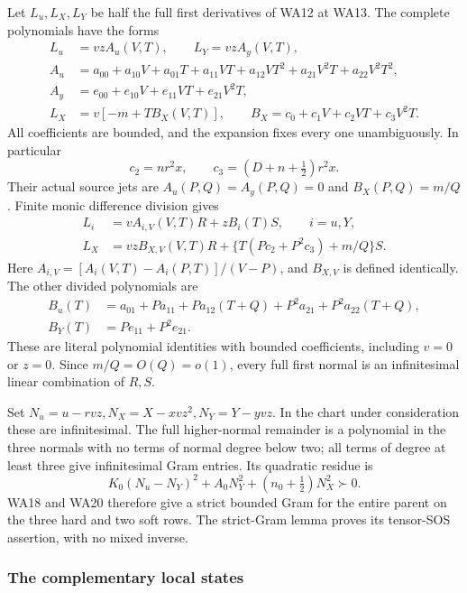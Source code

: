 Let \(L_u,L_X,L_Y\) be half the full first derivatives of WA12 at
WA13. The complete polynomials have the forms
\[
\begin{aligned}
 L_u&=vz A_u(V,T),\qquad L_Y=vz A_y(V,T),\\
 A_u&=a_{00}+a_{10}V+a_{01}T+a_{11}VT
                      +a_{12}VT^2+a_{21}V^2T+a_{22}V^2T^2,\\
 A_y&=e_{00}+e_{10}V+e_{11}VT+e_{21}V^2T,\\
 L_X&=v[-m+TB_X(V,T)],\qquad
 B_X=c_0+c_1V+c_2VT+c_3V^2T .
\end{aligned}\tag{WA19}
\]
All coefficients are bounded, and the expansion fixes every one
unambiguously. In particular
\[
 c_2=nr^2x,\qquad c_3=(D+n+\tfrac12)r^2x .
\]
Their actual source jets are \(A_u(P,Q)=A_y(P,Q)=0\) and
\(B_X(P,Q)=m/Q\). Finite monic difference division gives
\[
\begin{aligned}
 L_i&=v A_{i,V}(V,T)R+z B_i(T)S,\qquad i=u,Y,\\
 L_X&=vz B_{X,V}(V,T)R+
                \{T(Pc_2+P^2c_3)+m/Q\}S .
\end{aligned}\tag{WA20}
\]
Here \(A_{i,V}=[A_i(V,T)-A_i(P,T)]/(V-P)\), and \(B_{X,V}\)
is defined identically. The other divided polynomials are
\[
\begin{aligned}
B_u(T)&=a_{01}+Pa_{11}+Pa_{12}(T+Q)+P^2a_{21}
                                      +P^2a_{22}(T+Q),\\
B_Y(T)&=Pe_{11}+P^2e_{21}.
\end{aligned}
\]
These are literal polynomial identities with bounded coefficients,
including \(v=0\) or \(z=0\). Since \(m/Q=O(Q)=o(1)\),
every full first normal is an infinitesimal linear combination of \(R,S\).

Set \(N_u=u-rvz,N_X=X-xvz^2,N_Y=Y-yvz\). In the chart under
consideration these are infinitesimal. The full higher-normal
remainder is a polynomial in the three normals with no terms of
normal degree below two; all terms of degree at least three give
infinitesimal Gram entries. Its quadratic residue is
\[
 K_0(N_u-N_Y)^2+A_0N_Y^2+(n_0+\tfrac12)N_X^2\succ0.
 \tag{WA21}
\]
WA18 and WA20 therefore give a strict bounded Gram for the entire
parent on the three hard and two soft rows. The strict-Gram lemma
proves its tensor-SOS assertion, with no mixed inverse.

\subsubsection*{The complementary local states}

